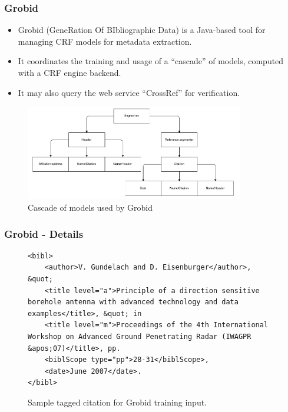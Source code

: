 \documentclass{beamer}
\begin{document}

\begin{frame}
\frametitle{Grobid}
\begin{itemize}
\item Grobid (GeneRation Of BIbliographic Data) is a Java-based tool for managing CRF models for metadata extraction.
\item It coordinates the training and usage of a ``cascade'' of models, computed with a CRF engine backend.
\item It may also query the web service ``CrossRef'' for verification.
\end{itemize}
\begin{figure}[!ht]
\center
\includegraphics[width=3.75in]{figures/cascade.pdf}
\caption{Cascade of models used by Grobid}
\end{figure}
\end{frame}


\begin{frame}[fragile]
\frametitle{Grobid - Details}

\begin{figure}
\lstset{language=XML}
\begin{lstlisting}
<bibl>
	<author>V. Gundelach and D. Eisenburger</author>, &quot; 
	<title level="a">Principle of a direction sensitive borehole antenna with advanced technology and data examples</title>, &quot; in 
	<title level="m">Proceedings of the 4th International Workshop on Advanced Ground Penetrating Radar (IWAGPR &apos;07)</title>, pp. 
	<biblScope type="pp">28-31</biblScope>, 
	<date>June 2007</date>.
</bibl>
\end{lstlisting}
\caption{Sample tagged citation for Grobid training input.}
\end{figure}

\end{frame}

\end{document}
